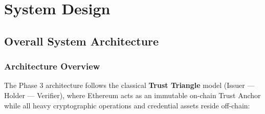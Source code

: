
\chapter{System Design}

\section{Overall System Architecture}

\subsection{Architecture Overview}

The Phase 3 architecture follows the classical \textbf{Trust Triangle} model (Issuer --- Holder --- Verifier), where Ethereum acts as an immutable on-chain Trust Anchor while all heavy cryptographic operations and credential assets reside off-chain:

